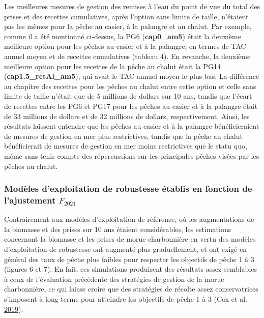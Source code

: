 \documentclass[11pt]{book}
\begin{document}
Les meilleures mesures de gestion des remises à l'eau du point de vue du total des prises et des recettes cumulatives, après l'option sans limite de taille, n'étaient pas les mêmes pour la pêche au casier, à la palangre et au chalut. Par exemple, comme il a été mentionné ci-dessus, la PG6 (\textbf{cap0\_am5}) était la deuxième meilleure option pour les pêches au casier et à la palangre, en termes de TAC annuel moyen et de recettes cumulatives (tableau 4). En revanche, la deuxième meilleure option pour les recettes de la pêche au chalut était la PG14 (\textbf{cap1.5\_rctAl\_am5}), qui avait le TAC annuel moyen le plus bas. La différence au chapitre des recettes pour les pêches au chalut entre cette option et celle sans limite de taille n'était que de 5 millions de dollars sur 10 ans, tandis que l'écart de recettes entre les PG6 et PG17 pour les pêches au casier et à la palangre était de 33 millions de dollars et de 32 millions de dollars, respectivement. Ainsi, les résultats laissent entendre que les pêches au casier et à la palangre bénéficieraient de mesures de gestion en mer plus restrictives, tandis que la pêche au chalut bénéficierait de mesures de gestion en mer moins restrictives que le statu quo, même sans tenir compte des répercussions sur les principales pêches visées par les pêches au chalut.

\hypertarget{moduxe8les-dexploitation-de-robustesse-uxe9tablis-en-fonction-de-lajustement-f_2021}{%
\subsubsection{\texorpdfstring{Modèles d'exploitation de robustesse établis en fonction de l'ajustement \(F_{2021}\)}{Modèles d'exploitation de robustesse établis en fonction de l'ajustement F\_\{2021\}}}\label{moduxe8les-dexploitation-de-robustesse-uxe9tablis-en-fonction-de-lajustement-f_2021}}

Contrairement aux modèles d'exploitation de référence, où les augmentations de la biomasse et des prises sur 10 ans étaient considérables, les estimations concernant la biomasse et les prises de morue charbonnière en vertu des modèles d'exploitation de robustesse ont augmenté plus graduellement, et ont exigé en général des taux de pêche plus faibles pour respecter les objectifs de pêche 1 à 3 (figures 6 et 7). En fait, ces simulations produisent des résultats assez semblables à ceux de l'évaluation précédente des stratégies de gestion de la morue charbonnière, ce qui laisse croire que des stratégies de récolte assez conservatrices s'imposent à long terme pour atteindre les objectifs de pêche 1 à 3 (Cox et al. \protect\hyperlink{ref-cox2019evaluating}{2019}).
\end{document}

